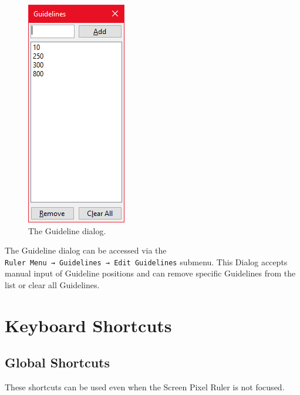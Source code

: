 \documentclass[
]{book}
\begin{document}
\begin{figure}
\centering
\includegraphics{images/guideline-dialog.png}
\caption{\label{fig:unnamed-chunk-3}The Guideline dialog.}
\end{figure}

The Guideline dialog can be accessed via the \texttt{Ruler\ Menu\ →\ Guidelines\ →\ Edit\ Guidelines} submenu.
This Dialog accepts manual input of Guideline positions and can remove specific Guidelines from the list or clear all Guidelines.

\chapter{Keyboard Shortcuts}\label{keyboard}

\section{Global Shortcuts}\label{global-shortcuts}

These shortcuts can be used even when the Screen Pixel Ruler is not focused.
\end{document}
